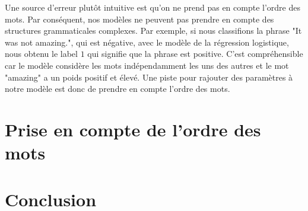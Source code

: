 \documentclass{article}
\begin{document}
Une source d'erreur plutôt intuitive est qu'on ne prend pas en compte l'ordre des mots. Par conséquent, nos modèles ne peuvent pas prendre en compte des structures grammaticales complexes. Par exemple, si nous classifions la phrase "It was not amazing.", qui est négative, avec le modèle de la régression logistique, nous obtenu le label $1$ qui signifie que la phrase est positive. C'est compréhensible car le modèle considère les mots indépendamment les uns des autres et le mot "amazing" a un poids positif et élevé. Une piste pour rajouter des paramètres à notre modèle est donc de prendre en compte l'ordre des mots.  


\clearpage

\section{Prise en compte de l'ordre des mots}

\section{Conclusion}

\clearpage



\end{document}
